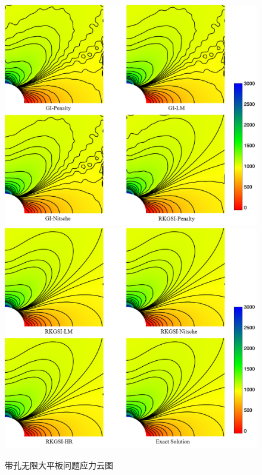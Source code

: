 \begin{figure}[H]
    \centering
    \includegraphics[scale=0.5]{figure/E/hole/hole.stress1.png}
    \includegraphics[scale=0.5]{figure/E/hole/hole.stress2.png}
    \caption{带孔无限大平板问题应力云图}\label{Hstress}
\end{figure}\newpage

  


